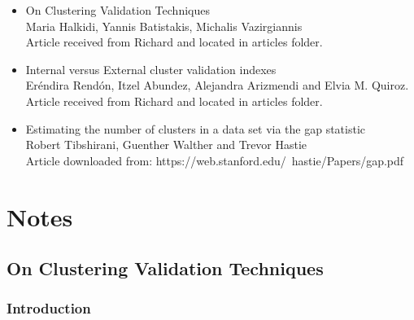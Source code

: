 \documentclass[a4paper,10pt]{article}
\begin{document}
\begin{itemize}
	\item On Clustering Validation Techniques \\
	Maria Halkidi, Yannis Batistakis, Michalis Vazirgiannis \\
	Article received from Richard and located in articles folder.
	
	\item Internal versus External cluster validation indexes \\
	Eréndira Rendón, Itzel Abundez, Alejandra Arizmendi and Elvia M. Quiroz. \\
	Article received from Richard and located in articles folder.
	
	\item Estimating the number of clusters	in a data set via the gap statistic \\
	Robert Tibshirani, Guenther Walther and Trevor Hastie \\
	Article downloaded from: https://web.stanford.edu/~hastie/Papers/gap.pdf
\end{itemize}

\section{Notes}

\subsection{On Clustering Validation Techniques}

\subsubsection{Introduction}
\end{document}
